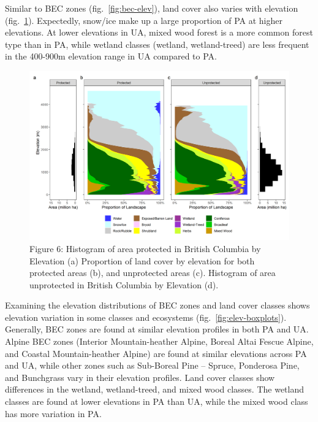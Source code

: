 \documentclass[10pt,oneside]{article}
\makeatletter
\def\maxwidth{\ifdim\Gin@nat@width>\linewidth\linewidth
\else\Gin@nat@width\fi}
\let\Oldincludegraphics\includegraphics
\renewcommand{\includegraphics}[1]{\Oldincludegraphics[width=\maxwidth]{#1}}
\makeatother
\begin{document}
Similar to BEC zones (fig.~\ref{fig:bec-elev}), land cover also varies
with elevation (fig.~\ref{fig:lcc-elev}). Expectedly, snow/ice make up a
large proportion of PA at higher elevations. At lower elevations in UA,
mixed wood forest is a more common forest type than in PA, while wetland
classes (wetland, wetland-treed) are less frequent in the 400-900m
elevation range in UA compared to PA.

\begin{figure}
\hypertarget{fig:lcc-elev}{%
\centering
\includegraphics{figures/lcc_elev_hist.png}
\caption{Figure 6: Histogram of area protected in British Columbia by
Elevation (a) Proportion of land cover by elevation for both protected
areas (b), and unprotected areas (c). Histogram of area unprotected in
British Columbia by Elevation (d).}\label{fig:lcc-elev}
}
\end{figure}

Examining the elevation distributions of BEC zones and land cover
classes shows elevation variation in some classes and ecosystems
(fig.~\ref{fig:elev-boxplots}). Generally, BEC zones are found at
similar elevation profiles in both PA and UA. Alpine BEC zones (Interior
Mountain-heather Alpine, Boreal Altai Fescue Alpine, and Coastal
Mountain-heather Alpine) are found at similar elevations across PA and
UA, while other zones such as Sub-Boreal Pine -- Spruce, Ponderosa Pine,
and Bunchgrass vary in their elevation profiles. Land cover classes show
differences in the wetland, wetland-treed, and mixed wood classes. The
wetland classes are found at lower elevations in PA than UA, while the
mixed wood class has more variation in PA.
\end{document}

